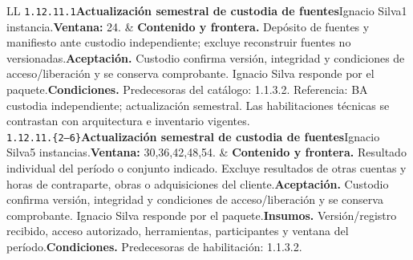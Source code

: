 \begin{longtable}{L{\tabcolsep\relax}L{\tabcolsep\relax}}
\texttt{1.\allowbreak{}12.\allowbreak{}11.\allowbreak{}1}\newline{}\textbf{Actualización semestral de custodia de fuentes}\newline{}Ignacio Silva\newline{}1 instancia.\newline{}\textbf{Ventana:} 24. & \textbf{Contenido y frontera.} Depósito de fuentes y manifiesto ante custodio independiente; excluye reconstruir fuentes no versionadas.\newline{}\textbf{Aceptación.} Custodio confirma versión, integridad y condiciones de acceso/liberación y se conserva comprobante. Ignacio Silva responde por el paquete.\newline{}\textbf{Condiciones.} Predecesoras del catálogo: 1.1.3.2. Referencia: BA custodia independiente; actualización semestral. Las habilitaciones técnicas se contrastan con arquitectura e inventario vigentes.\\\hline
\texttt{1.\allowbreak{}12.\allowbreak{}11.\allowbreak{}\{2--6\}}\newline{}\textbf{Actualización semestral de custodia de fuentes}\newline{}Ignacio Silva\newline{}5 instancias.\newline{}\textbf{Ventana:} 30,36,42,48,54. & \textbf{Contenido y frontera.} Resultado individual del período o conjunto indicado. Excluye resultados de otras cuentas y horas de contraparte, obras o adquisiciones del cliente.\newline{}\textbf{Aceptación.} Custodio confirma versión, integridad y condiciones de acceso/liberación y se conserva comprobante. Ignacio Silva responde por el paquete.\newline{}\textbf{Insumos.} Versión/registro recibido, acceso autorizado, herramientas, participantes y ventana del período.\newline{}\textbf{Condiciones.} Predecesoras de habilitación: 1.1.3.2.\\\hline

\end{longtable}
